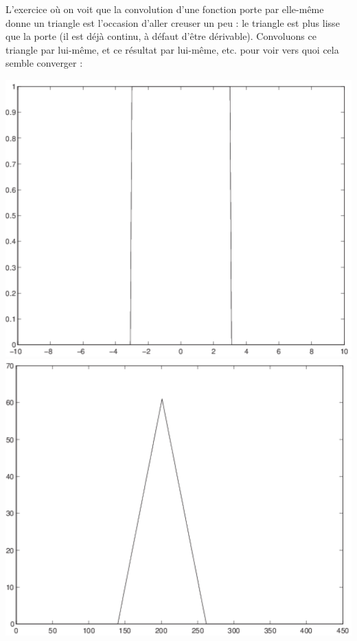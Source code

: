 \begin{example}
L'exercice où on voit que la convolution d'une fonction { porte
} par elle-même donne un triangle est l'occasion d'aller creuser un
peu : le triangle est plus { lisse } que la porte (il est déjà continu,
à défaut d'être dérivable). Convoluons ce triangle par lui-même, et ce
résultat par lui-même, etc. pour voir vers quoi cela semble converger
:

\begin{center}
\includegraphics[scale=0.25]{convgauss1.pdf} 
\includegraphics[scale=0.25]{convgauss2.pdf}

\end{center}
\end{example}
